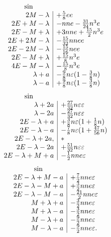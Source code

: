 \[
\begin{array}{r|l}
\multicolumn{1}{c}{\sin}&\\
2M-\lambda&+\tfrac58ee\\
2E+M-\lambda&-nne-\tfrac{31}{24}n^3e\\
2E-M+\lambda&+3nne+\tfrac{15}{2}n^3e\\
2E+2M-\lambda&-\tfrac{15}{32}nnee\\
2E-2M-\lambda&-\tfrac{15}{16}nee\\
2E-M+\lambda&+\tfrac{15}{8}n^3e\\
4E-M-\lambda&-\tfrac{15}{8}n^3e\\
\lambda+a&-\tfrac98n\varepsilon(1-\tfrac38n)\\
\lambda-a&+\tfrac98n\varepsilon(1-\tfrac38n)
\end{array}
\]
\endgroup
{}
\begingroup\small
\setlength{\arraycolsep}{4pt}
\renewcommand{\arraystretch}{1.3}
\[
\begin{array}{r|l}
\multicolumn{1}{c}{\sin}&\\
\lambda+2a&+\tfrac{27}{32}n\varepsilon\varepsilon\\
\lambda-2a&-\tfrac{27}{32}n\varepsilon\varepsilon\\
2E-\lambda+a&+\tfrac38n\varepsilon(1+\tfrac18n)\\
2E-\lambda-a&-\tfrac78n\varepsilon(1+\tfrac{47}{56}n)\\
2E-\lambda+2a,&*\\
2E-\lambda-2a&+\tfrac{51}{32}n\varepsilon\varepsilon\\
2E-\lambda+M+a&-\tfrac12nne\varepsilon
\end{array}
\]
\[
\begin{array}{r|l}
\multicolumn{1}{c}{\sin}&\\
2E-\lambda+M-a&+\tfrac72nne\varepsilon\\
2E-\lambda-M+a&+\tfrac32nne\varepsilon\\
2E-\lambda-M-a&-\tfrac{21}{2}nne\varepsilon\\
M+\lambda+a&-\tfrac32nne\varepsilon\\
M+\lambda-a&-\tfrac32nne\varepsilon\\
M-\lambda+a&-\tfrac92nne\varepsilon\\
M-\lambda-a&-\tfrac92nne\varepsilon.
\end{array}
\]
\endgroup
\clearpage
\endgroup
